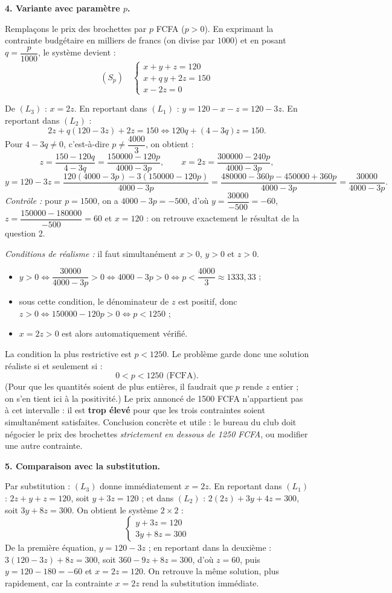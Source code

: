 \documentclass[11pt]{article}
\begin{document}
\begin{exoresolu}
\textbf{4. Variante avec paramètre $p$.}

Remplaçons le prix des brochettes par $p$ FCFA ($p>0$). En exprimant la contrainte budgétaire en milliers de francs (on divise par $1000$) et en posant $q=\dfrac{p}{1000}$, le système devient :
\[
(S_p)\quad\begin{cases} x+y+z=120\\ x+q\,y+2z=150\\ x-2z=0\end{cases}
\]

De $(L_3)$ : $x=2z$. En reportant dans $(L_1)$ : $y=120-x-z=120-3z$. En reportant dans $(L_2)$ :
\[
2z+q(120-3z)+2z=150 \iff 120q+(4-3q)z=150.
\]
Pour $4-3q\neq 0$, c'est-à-dire $p\neq \dfrac{4000}{3}$, on obtient :
\[
z=\dfrac{150-120q}{4-3q}=\dfrac{150000-120p}{4000-3p},\qquad x=2z=\dfrac{300000-240p}{4000-3p},
\]
\[
y=120-3z=\dfrac{120(4000-3p)-3(150000-120p)}{4000-3p}=\dfrac{480000-360p-450000+360p}{4000-3p}=\dfrac{30000}{4000-3p}.
\]
\emph{Contrôle :} pour $p=1500$, on a $4000-3p=-500$, d'où $y=\dfrac{30000}{-500}=-60$, $z=\dfrac{150000-180000}{-500}=60$ et $x=120$ : on retrouve exactement le résultat de la question 2.

\emph{Conditions de réalisme :} il faut simultanément $x>0$, $y>0$ et $z>0$.
\begin{itemize}
\item $y>0 \iff \dfrac{30000}{4000-3p}>0 \iff 4000-3p>0 \iff p<\dfrac{4000}{3}\approx 1333,33$ ;
\item sous cette condition, le dénominateur de $z$ est positif, donc $z>0 \iff 150000-120p>0 \iff p<1250$ ;
\item $x=2z>0$ est alors automatiquement vérifié.
\end{itemize}
La condition la plus restrictive est $p<1250$. Le problème garde donc une solution réaliste si et seulement si :
\[
0<p<1250 \text{ (FCFA)}.
\]
(Pour que les quantités soient de plus entières, il faudrait que $p$ rende $z$ entier ; on s'en tient ici à la positivité.) Le prix annoncé de \num{1500} FCFA n'appartient pas à cet intervalle : il est \textbf{trop élevé} pour que les trois contraintes soient simultanément satisfaites. Conclusion concrète et utile : le bureau du club doit négocier le prix des brochettes \emph{strictement en dessous de \num{1250} FCFA}, ou modifier une autre contrainte.

\textbf{5. Comparaison avec la substitution.}

Par substitution : $(L_3)$ donne immédiatement $x=2z$. En reportant dans $(L_1)$ : $2z+y+z=120$, soit $y+3z=120$ ; et dans $(L_2)$ : $2(2z)+3y+4z=300$, soit $3y+8z=300$. On obtient le système $2\times 2$ :
\[
\begin{cases} y+3z=120\\ 3y+8z=300\end{cases}
\]
De la première équation, $y=120-3z$ ; en reportant dans la deuxième : $3(120-3z)+8z=300$, soit $360-9z+8z=300$, d'où $z=60$, puis $y=120-180=-60$ et $x=2z=120$. On retrouve la même solution, plus rapidement, car la contrainte $x=2z$ rend la substitution immédiate.


\end{exoresolu}
\end{document}
